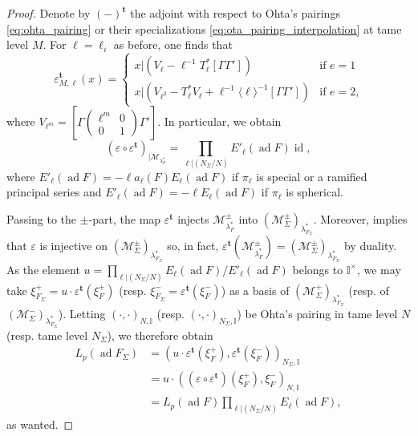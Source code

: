 \documentclass[12pt]{amsart}
\newcommand\bI{\mathbb{I}}
\newcommand\cM{\mathcal{M}}
\DeclareMathOperator{\id}{id}
\DeclareMathOperator{\ad}{ad}
\theoremstyle{defstyle}
\theoremstyle{thmstyle}
\begin{document}
\begin{proof}
	 Denote by $(-)^\textbf{t}$ the adjoint with respect to Ohta's pairings \eqref{eq:ohta_pairing} or their specializations \eqref{eq:ota_pairing_interpolation} at tame level $M$. For $\ell=\ell_i$ as before, one finds that
	 \[\varepsilon_{M,\ell}^\textbf{t}(x)=\left\{\begin{array}{ll}
	 	x\big|(V_\ell-\ell^{-1}T_\ell^* \left[ \Gamma \Gamma' \right]) & \textrm{if $e=1$} \\
	 	x\big|(V_{\ell^2}-T_\ell^*V_\ell+ \ell^{-1} \langle \ell \rangle^{-1}\left[ \Gamma \Gamma' \right]) & \textrm{if $e=2$,}
	 \end{array}\right.\]
	where $V_{\ell^m}=\left[\Gamma\begin{pmatrix}\ell^m & 0 \\ 0 & 1\end{pmatrix}\Gamma'\right]$. In particular, we obtain
	\[(\varepsilon\circ\varepsilon^\textbf{t})_{|\cM_{\lambda^*_{F}}}=\prod_{\ell|(N_\Sigma/N)}E'_\ell(\ad F) \id,\]
	where  $E'_{\ell}(\ad F)=-\ell a_{\ell}(F) E_{\ell}(\ad F)$ if $\pi_\ell$ is special or a ramified principal series and $E'_{\ell}(\ad F)=-\ell E_{\ell}(\ad F)$ if $\pi_\ell$ is spherical.
	
	Passing to the $\pm$-part, the map $\varepsilon^\textbf{t}$ injects $\cM_{\lambda^*_{F}}^\pm$ into $(\cM^\pm_{\Sigma})_{\lambda^*_{F_\Sigma}}$. Moreover, \cite[Thm. 3.6.2]{emerton2006variation} implies that $\varepsilon$ is injective on $(\cM^\pm_{\Sigma})_{\lambda^*_{F_\Sigma}}$ so, in fact, $\varepsilon^\textbf{t}(\cM^\pm_{\lambda^*_F})=(\cM^\pm_{\Sigma})_{\lambda^*_{F_\Sigma}}$ by duality. As the element $u=\prod_{\ell|(N_\Sigma/N)}E_\ell(\ad F)/E'_\ell(\ad F)$ belongs to $\bI^\times$, we may take $\xi_{F_\Sigma}^+= u\cdot \varepsilon^\textbf{t}(\xi^+_F)$ (resp.  $\xi_{F_\Sigma}^-=\varepsilon^\textbf{t}(\xi^-_F)$) as a basis of $(\cM^+_{\Sigma})_{\lambda^*_{F_\Sigma}}$ (resp. of $(\cM^-_{\Sigma})_{\lambda^*_{F_\Sigma}}$). 
	Letting $(\cdot,\cdot)_{N,\bI}$ (resp. $(\cdot,\cdot)_{N_\Sigma,\bI}$) be Ohta's pairing in tame level $N$ (resp. tame level $N_\Sigma$), we therefore obtain 
	\begin{align*}
		L_p(\ad F_\Sigma) &= (u\cdot \varepsilon^\textbf{t}(\xi^+_{F}),\varepsilon^\textbf{t}(\xi^-_{F}))_{N_\Sigma,\bI} \\
		&=u\cdot ((\varepsilon\circ\varepsilon^\textbf{t})(\xi^+_F),\xi^-_F)_{N,\bI} \\
		&= L_p(\ad F)\prod_{\ell|(N_\Sigma/N)}E_\ell(\ad F),
	\end{align*}
	as wanted.
\end{proof}
\end{document}
